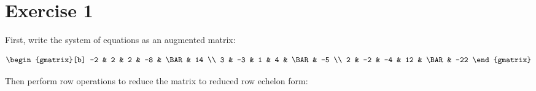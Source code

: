 \section{Exercise 1}

First, write the system of equations as an augmented matrix:

$$
	\begin{gmatrix}[b]
		-2 & 2  & 2  & -8 & \BAR & 14  \\
		3  & -3 & 1  & 4  & \BAR & -5  \\
		2  & -2 & -4 & 12 & \BAR & -22
	\end{gmatrix}
$$

Then perform row operations to reduce the matrix to reduced row echelon form:


